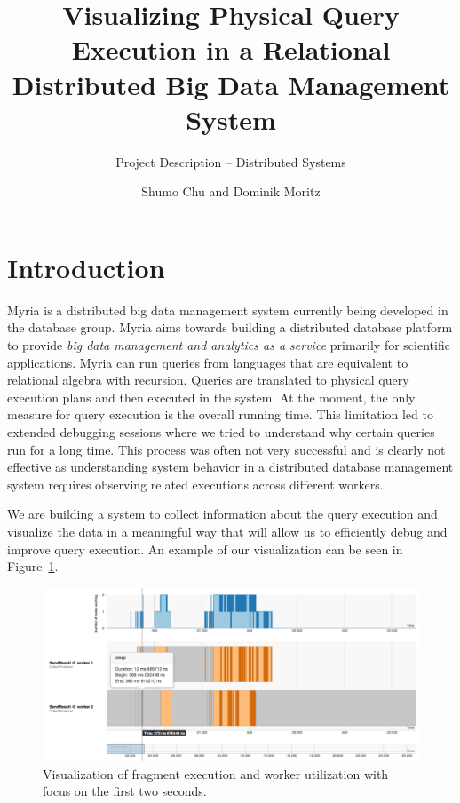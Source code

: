 \documentclass[11pt]{scrartcl}
\begin{document}

\title{Visualizing Physical Query Execution in a Relational Distributed Big Data Management System}
\subtitle{Project Description \--- Distributed Systems}
\author{Shumo Chu and Dominik Moritz}
\date{}

\maketitle

\section{Introduction}

Myria is a distributed big data management system currently being developed in the database group. Myria aims towards building a distributed database platform to provide \emph{big data management and analytics as a service} primarily for scientific applications. Myria can run queries from languages that are equivalent to relational algebra with recursion. Queries are translated to physical query execution plans and then executed in the system. At the moment, the only measure for query execution is the overall running time. This limitation led to extended debugging sessions where we tried to understand why certain queries run for a long time. This process was often not very successful and is clearly not effective as understanding system behavior in a distributed database management system requires observing related executions across different workers.

We are building a system to collect information about the query execution and visualize the data in a meaningful way that will allow us to efficiently debug and improve query execution. An example of our visualization can be seen in Figure~\ref{fig:fig1}.

\begin{figure}[H]
  \begin{center}
    \includegraphics[width=.8\textwidth]{figure1}
  \end{center}
  \caption{Visualization of fragment execution and worker utilization with focus on the first two seconds.}
  \label{fig:fig1}
\end{figure}
\end{document}
